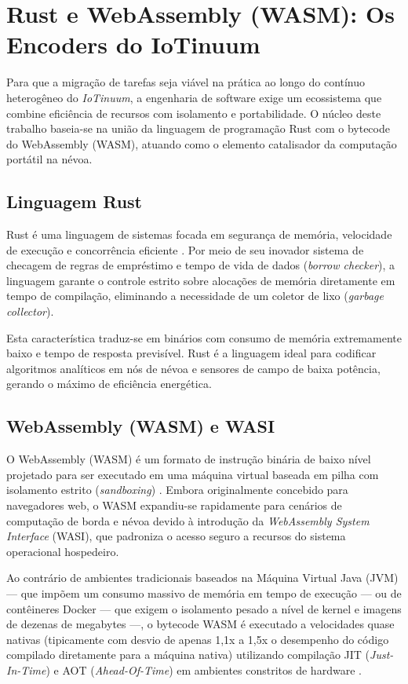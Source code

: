 \documentclass[
	12pt,
	openright,
	oneside,
	a4paper,
	english,
	brazil
	]{abntex2}
\begin{document}
\section{Rust e WebAssembly (WASM): Os Encoders do IoTinuum}

Para que a migração de tarefas seja viável na prática ao longo do contínuo heterogêneo do \textit{IoTinuum}, a engenharia de software exige um ecossistema que combine eficiência de recursos com isolamento e portabilidade. O núcleo deste trabalho baseia-se na união da linguagem de programação Rust com o bytecode do WebAssembly (WASM), atuando como o elemento catalisador da computação portátil na névoa.

\subsection{Linguagem Rust}

Rust é uma linguagem de sistemas focada em segurança de memória, velocidade de execução e concorrência eficiente \cite{matsakis2014rust}. Por meio de seu inovador sistema de checagem de regras de empréstimo e tempo de vida de dados (\textit{borrow checker}), a linguagem garante o controle estrito sobre alocações de memória diretamente em tempo de compilação, eliminando a necessidade de um coletor de lixo (\textit{garbage collector}). 

Esta característica traduz-se em binários com consumo de memória extremamente baixo e tempo de resposta previsível. Rust é a linguagem ideal para codificar algoritmos analíticos em nós de névoa e sensores de campo de baixa potência, gerando o máximo de eficiência energética.

\subsection{WebAssembly (WASM) e WASI}

O WebAssembly (WASM) é um formato de instrução binária de baixo nível projetado para ser executado em uma máquina virtual baseada em pilha com isolamento estrito (\textit{sandboxing}) \cite{haas2017wasm}. Embora originalmente concebido para navegadores web, o WASM expandiu-se rapidamente para cenários de computação de borda e névoa devido à introdução da \textit{WebAssembly System Interface} (WASI), que padroniza o acesso seguro a recursos do sistema operacional hospedeiro.

Ao contrário de ambientes tradicionais baseados na Máquina Virtual Java (JVM) — que impõem um consumo massivo de memória em tempo de execução — ou de contêineres Docker — que exigem o isolamento pesado a nível de kernel e imagens de dezenas de megabytes —, o bytecode WASM é executado a velocidades quase nativas (tipicamente com desvio de apenas 1,1x a 1,5x o desempenho do código compilado diretamente para a máquina nativa) utilizando compilação JIT (\textit{Just-In-Time}) e AOT (\textit{Ahead-Of-Time}) em ambientes constritos de hardware \cite{varia2021wasm}.
\end{document}
